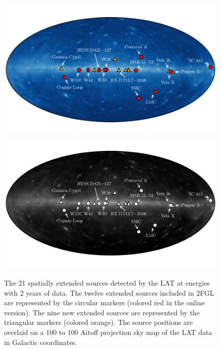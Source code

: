 \clearpage
  \begin{figure}
      \ifcolorfigure
      \includegraphics{summary_plots/allsky_extended_sources_color.pdf}
      \else
      \includegraphics{summary_plots/allsky_extended_sources_bw.pdf}
      \fi
      \caption{The 21
      spatially extended sources detected by the LAT
      at \gev energies 
      with 2 years of data.  The twelve extended sources included in
      2FGL are represented by the circular markers (colored red in the online
      version).  The nine new extended sources are represented by
      the triangular markers (colored orange).
      The source positions are overlaid on a 100 \mev to 100 \gev 
      Aitoff projection sky map of the LAT data in Galactic coordinates.
}
  \end{figure}


